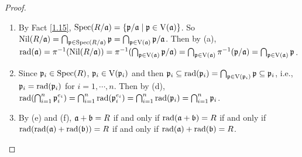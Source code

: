 \begin{proof}
\begin{enumerate}
        \item
            By Fact \ref{1.15}, $\operatorname{Spec}(R/\mathfrak{a}) = \{\mathfrak{p}/\mathfrak{a} \mid \mathfrak{p} \in \operatorname{V}(\mathfrak{a})\}$. So $\operatorname{Nil}(R/\mathfrak{a}) = \bigcap_{\mathfrak{p} \in \operatorname{Spec}(R/\mathfrak{a})} \mathfrak{p} = \bigcap_{\mathfrak{p} \in \operatorname{V}(\mathfrak{a})} \mathfrak{p}/\mathfrak{a}$. Then by (a), $\operatorname{rad}(\mathfrak{a}) = \pi^{-1}(\operatorname{Nil}(R/\mathfrak{a}))  = \pi^{-1}(\bigcap_{\mathfrak{p} \in \operatorname{V}(\mathfrak{a})} \mathfrak{p}/\mathfrak{a}) = \bigcap_{\mathfrak{p} \in \operatorname{V}(\mathfrak{a})} \pi^{-1}(\mathfrak{p}/\mathfrak{a}) = \bigcap_{\mathfrak{p} \in \operatorname{V}(\mathfrak{a})} \mathfrak{p}$.
        \item Since $\mathfrak{p}_i \in \operatorname{Spec}(R)$, $\mathfrak{p}_i \in \operatorname{V}(\mathfrak{p}_i)$ and then $\mathfrak{p}_i \subseteq \operatorname{rad}(\mathfrak{p}_i) = \bigcap_{\mathfrak{p} \in \operatorname{V}(\mathfrak{p}_i)}\mathfrak{p} \subseteq \mathfrak{p}_i$, i.e., $\mathfrak{p}_i = \operatorname{rad}(\mathfrak{p}_i)$ for $i = 1,\cdots,n$. Then by (d), $\operatorname{rad}(\bigcap_{i=1}^n \mathfrak{p}_i^{e_i}) = \bigcap_{i=1}^n \operatorname{rad}(\mathfrak{p}_i^{e_i}) = \bigcap_{i=1}^n \operatorname{rad}(\mathfrak{p}_i) = \bigcap_{i=1}^n \mathfrak{p}_i$. 
        \item
            By (e) and (f), $\mathfrak{a} + \mathfrak{b} = R$ if and only if $\operatorname{rad}(\mathfrak{a} + \mathfrak{b}) = R$ if and only if $\operatorname{rad}(\operatorname{rad}(\mathfrak{a}) + \operatorname{rad}(\mathfrak{b})) = R$ if and only if $\operatorname{rad}(\mathfrak{a}) + \operatorname{rad}(\mathfrak{b}) = R$. \qedhere
    \end{enumerate}
\end{proof}

